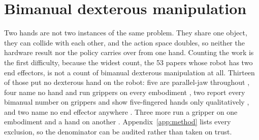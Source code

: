 \section{Bimanual dexterous manipulation}
\label{sec:bimanual}

\makeatletter
{}
\makeatother

Two hands are not two instances of the same problem. They share one object, they can collide
with each other, and the action space doubles, so neither the hardware result nor the policy
carries over from one hand. Counting the work is the first difficulty, because the widest count,
the 53 papers whose robot has two end effectors, is not a count of bimanual dexterous manipulation
at all. Thirteen of those put no dexterous hand on the robot: five are parallel-jaw throughout
\cite{aloha_act_2023,rdt1b_2024,egomimic_2024,h_rdt_2025,umi_2024}, four name no hand and run
grippers on every embodiment \cite{pi0_2024,pi05_2025,pistar06_2025,diffusion_policy_2023}, two
report every bimanual number on grippers and show five-fingered hands only qualitatively
\cite{gemini_robotics_2025,gemini_robotics_15_2025}, and two name no end effector anywhere
\cite{helix_2025,groot_n16_2025}. Three more run a gripper on one embodiment and a hand on another
\cite{ace_teleop_2024,dp3_2024,open_television_2024}. Appendix~\ref{app:method} lists every
exclusion, so the denominator can be audited rather than taken on trust.

